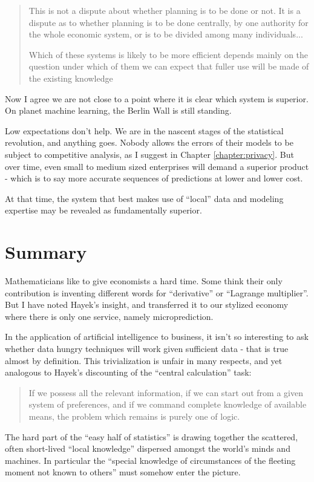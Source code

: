 \begin{quote}{\cite{Hayek1945TheHayek}}
This is not a dispute about whether planning is to be done or not. It is a dispute as to whether planning is to be done centrally, by one authority for the whole economic system, or is to be divided among many individuals... 

Which of these systems is likely to be more efficient depends mainly on the question under which of them we can expect that fuller use will be made of the existing knowledge
\end{quote}
Now I agree we are not close to a point where it is clear which system is superior. On planet machine learning, the Berlin Wall is still standing. 

Low expectations don't help. We are in the nascent stages of the statistical revolution, and anything goes. Nobody allows the errors of their models to be subject to competitive analysis, as I suggest in Chapter \ref{chapter:privacy}. But over time, even small to medium sized enterprises will demand a superior product - which is to say more accurate sequences of predictions at lower and lower cost. 

At that time, the system that best makes use of ``local'' data and modeling expertise may be revealed as fundamentally superior.  

\section{Summary}

Mathematicians like to give economists a hard time. Some think their only contribution is inventing different words for ``derivative'' or ``Lagrange multiplier''. But I have noted Hayek's insight, and transferred it to our stylized economy where there is only one service, namely microprediction. 

In the application of artificial intelligence to business, it isn't so interesting to ask whether data hungry techniques will work given sufficient data - that is true almost by definition. This trivialization is unfair in many respects, and yet analogous to Hayek's discounting of the ``central calculation'' task: 
\begin{quote}{\cite{Hayek1945TheHayek}}
If we possess all the relevant information,
if we can start out from a given system of preferences, and
if we command complete knowledge of available means, the problem which remains is purely one of logic. 
\end{quote}
The hard part of the ``easy half of statistics'' is drawing together the scattered, often short-lived ``local knowledge'' dispersed amongst the world's minds and machines. In particular the ``special knowledge of circumstances of the fleeting moment not known to others'' must somehow enter the picture. 

